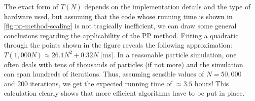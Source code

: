 The exact form of $T(N)$ depends on the implementation details and the type of hardware used, but assuming that the code whose running time is shown in \autoref{fig:pp-method-scaling} is not tragically inefficient, we can draw some general conclusions regarding the applicability of the PP method.
Fitting a quadratic through the points shown in the figure reveals the following approximation: $T(1{,}000N) \approx 26.1N^2 + 0.32N$ [ms].
In a reasonable particle simulation, one often deals with tens of thousands of particles (if not more) and the simulation can span hundreds of iterations.
Thus, assuming sensible values of $N = 50{,}000$ and 200 iterations, we get the expected running time of $\approx 3.5$ hours!
This calculation clearly shows that more efficient algorithms have to be put in place.
